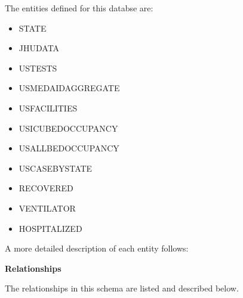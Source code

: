 \documentclass[11pt]{article}
\begin{document}
\noindent
The entities defined for this databse are: \\

\begin{itemize}
    \item STATE
    \item JHUDATA
    \item USTESTS
    \item USMEDAIDAGGREGATE
    \item USFACILITIES
    \item USICUBEDOCCUPANCY
    \item USALLBEDOCCUPANCY
    \item USCASEBYSTATE
    \item RECOVERED
    \item VENTILATOR
    \item HOSPITALIZED
\end{itemize}

\noindent
A more detailed description of each entity follows:

\pagebreak

\noindent
\textbf{Relationships}

\noindent
The relationships in this schema are listed and described below. \\
\end{document}

